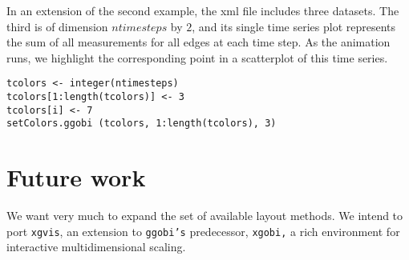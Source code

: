 \documentclass[11pt]{article}
\begin{document}
In an extension of the second example, the xml file includes three
datasets.  The third is of dimension $ntimesteps$ by $2$, and its
single time series plot represents the sum of all measurements
for all edges at each time step.  As the animation runs,
we highlight the corresponding point in a scatterplot of this time series.

\begin{verbatim}
tcolors <- integer(ntimesteps)
tcolors[1:length(tcolors)] <- 3
tcolors[i] <- 7
setColors.ggobi (tcolors, 1:length(tcolors), 3)
\end{verbatim}

\section{Future work}

We want very much to expand the set of available layout methods.
We intend to port {\tt xgvis}, an extension to {\tt ggobi's} predecessor,
{\tt xgobi,} a rich environment for interactive multidimensional scaling.



\end{document}
